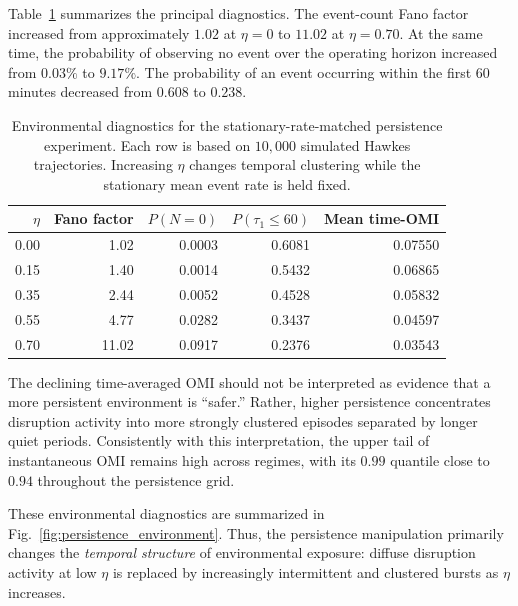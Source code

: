 \documentclass[preprint,12pt]{elsarticle}
\newcommand{\1}{\mathbf{1}}
\begin{document}
Table~\ref{tab:environmental_persistence} summarizes the principal diagnostics.
The event-count Fano factor increased from approximately $1.02$ at $\eta=0$ to
$11.02$ at $\eta=0.70$. At the same time, the probability of observing no
event over the operating horizon increased from $0.03\%$ to $9.17\%$.
The probability of an event occurring within the first 60 minutes decreased
from $0.608$ to $0.238$.

\begin{table}[t]
	\centering
	\caption{Environmental diagnostics for the stationary-rate-matched persistence
		experiment. Each row is based on $10{,}000$ simulated Hawkes trajectories.
		Increasing $\eta$ changes temporal clustering while the stationary mean event
		rate is held fixed.}
	\label{tab:environmental_persistence}
	\begin{tabular}{rrrrr}
		\toprule
		$\eta$ &
		Fano factor &
		$P(N=0)$ &
		$P(\tau_1\le60)$ &
		Mean time-OMI \\
		\midrule
		0.00 & 1.02  & 0.0003 & 0.6081 & 0.07550 \\
		0.15 & 1.40  & 0.0014 & 0.5432 & 0.06865 \\
		0.35 & 2.44  & 0.0052 & 0.4528 & 0.05832 \\
		0.55 & 4.77  & 0.0282 & 0.3437 & 0.04597 \\
		0.70 & 11.02 & 0.0917 & 0.2376 & 0.03543 \\
		\bottomrule
	\end{tabular}
\end{table}

The declining time-averaged OMI should not be interpreted as evidence that a
more persistent environment is ``safer.'' Rather, higher persistence
concentrates disruption activity into more strongly clustered episodes separated
by longer quiet periods. Consistently with this interpretation, the upper tail
of instantaneous OMI remains high across regimes, with its $0.99$ quantile close
to $0.94$ throughout the persistence grid.

These environmental diagnostics are summarized in Fig.~\ref{fig:persistence_environment}.
Thus, the persistence manipulation primarily changes the \emph{temporal
	structure} of environmental exposure: diffuse disruption activity at low
$\eta$ is replaced by increasingly intermittent and clustered bursts as
$\eta$ increases.
\end{document}
